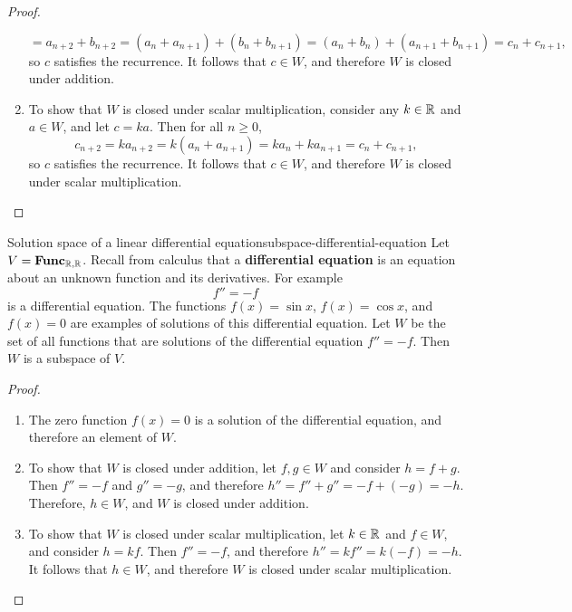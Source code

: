 \begin{proof}
\begin{enumerate}
\begin{equation*}
      = a_{n+2} + b_{n+2}
      = (a_n + a_{n+1}) + (b_n + b_{n+1})
      = (a_n + b_n) + (a_{n+1} + b_{n+1})
      = c_n + c_{n+1},
    \end{equation*}
    so $c$ satisfies the recurrence. It follows that $c\in W$, and
    therefore $W$ is closed under addition.
  \item To show that $W$ is closed under scalar multiplication,
    consider any $k\in\mathbb{R}$ and $a\in W$, and let $c=ka$. Then for all
    $n\geq 0$,
    \begin{equation*}
      c_{n+2}
      = ka_{n+2}
      = k(a_n + a_{n+1})
      = ka_n + ka_{n+1}
      = c_n + c_{n+1},
    \end{equation*}
    so $c$ satisfies the recurrence. It follows that $c\in W$, and
    therefore $W$ is closed under scalar multiplication.
  \end{enumerate}
\end{proof}

\begin{example}{Solution space of a linear differential equation}{subspace-differential-equation}
  Let $V=\mathbf{Func}_{\mathbb{R},\mathbb{R}}$. Recall from calculus that a
  \textbf{differential equation}%
   is an equation about an unknown
  function and its derivatives. For example
  \begin{equation*}
    f'' = -f
  \end{equation*}
  is a differential equation. The functions $f(x)=\sin x$,
  $f(x)=\cos x$, and $f(x)=0$ are examples of solutions of this
  differential equation.  Let $W$ be the set of all functions that are
  solutions of the differential equation $f'' = -f$. Then $W$ is a
  subspace of\/ $V$.
\end{example}

\begin{proof}
  \begin{enumerate}
  \item The zero function $f(x)=0$ is a solution of the differential
    equation, and therefore an element of\/ $W$.
  \item To show that $W$ is closed under addition, let $f,g\in W$ and
    consider $h=f+g$. Then $f''=-f$ and $g''=-g$, and therefore
    $h'' = f'' + g'' = -f+(-g) = -h$. Therefore, $h\in W$, and $W$ is
    closed under addition.
  \item To show that $W$ is closed under scalar multiplication, let
    $k\in\mathbb{R}$ and $f\in W$, and consider $h=kf$. Then $f''=-f$, and
    therefore $h'' = kf'' = k(-f) = -h$. It follows that $h\in W$, and
    therefore $W$ is closed under scalar multiplication.
  \end{enumerate}
\end{proof}

